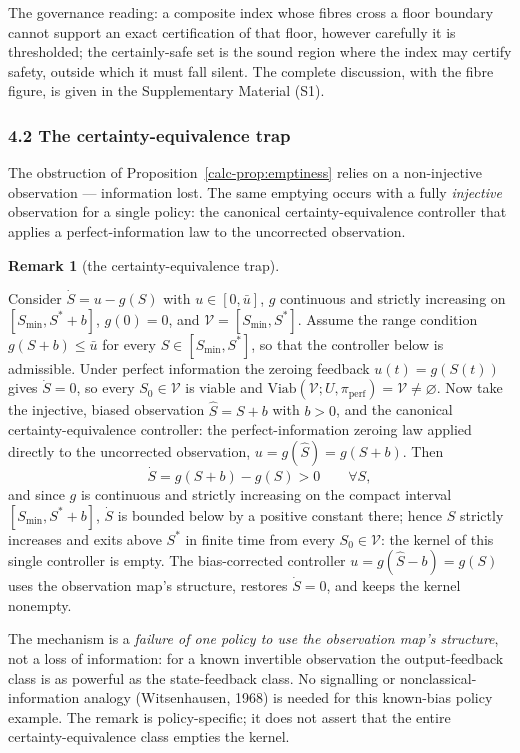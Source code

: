 \documentclass[10pt,twocolumn]{article}
\theoremstyle{definition}
\newtheorem{remark}{Remark}
\begin{document}
The governance reading: a composite index whose fibres cross a floor boundary cannot support an exact certification of that floor, however carefully it is thresholded; the certainly-safe set is the sound region where the index may certify safety, outside which it must fall silent. The complete discussion, with the fibre figure, is given in the Supplementary Material (S1).

\subsubsection{4.2 The certainty-equivalence
trap}\label{calc-the-certainty-equivalence-trap}

The obstruction of Proposition~\ref{calc-prop:emptiness} relies on a non-injective observation ---
information lost. The same emptying occurs with a fully
\emph{injective} observation for a single policy: the canonical
certainty-equivalence controller that applies a perfect-information law
to the uncorrected observation.

\begin{remark}[the certainty-equivalence trap]\label{calc-rem:ce-trap}

Consider \(\dot S = u - g(S)\) with \(u \in [0, \bar u]\), \(g\) continuous and strictly
increasing on \([S_{\min}, S^* + b]\), \(g(0) = 0\), and
\(\mathcal{V} = [S_{\min}, S^*]\). Assume the range condition
\(g(S + b) \le \bar u\) for every \(S \in [S_{\min}, S^*]\), so that the
controller below is admissible. Under perfect information the zeroing
feedback \(u(t) = g(S(t))\) gives \(\dot S = 0\), so every
\(S_0 \in \mathcal{V}\) is viable and
\(\mathrm{Viab}(\mathcal{V}; U, \pi_{\mathrm{perf}}) = \mathcal{V} \neq \varnothing\).
Now take the injective, biased observation \(\hat S = S + b\) with
\(b > 0\), and the canonical certainty-equivalence controller: the
perfect-information zeroing law applied directly to the uncorrected
observation, \(u = g(\hat S) = g(S + b)\). Then
\[\dot S = g(S + b) - g(S) > 0 \qquad \forall S,\]
and since \(g\) is continuous and strictly increasing on the compact interval
\([S_{\min}, S^* + b]\), \(\dot S\) is bounded below by a positive
constant there; hence \(S\) strictly increases and exits above \(S^*\) in
finite time from every \(S_0 \in \mathcal{V}\): the kernel of this single
controller is empty. The bias-corrected controller
\(u = g(\hat S - b) = g(S)\) uses the observation map's structure, restores
\(\dot S = 0\), and keeps the kernel nonempty.

The mechanism is a \emph{failure of one policy to use the observation
map's structure}, not a loss of information: for a known invertible
observation the output-feedback class is as powerful as the
state-feedback class. No signalling or nonclassical-information analogy (Witsenhausen, 1968) is needed for this known-bias policy example. The remark is
policy-specific; it does not assert that the entire certainty-equivalence
class empties the kernel.

\end{remark}
\end{document}
